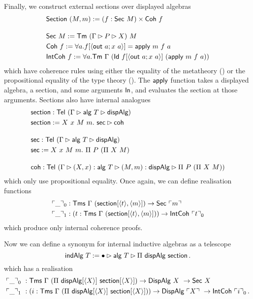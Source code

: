 Finally, we construct external sections over displayed algebras
\begin{align*}
     &\mta{Section}\ (M, m) := (f : \mta{Sec}\ M) \times \mta{Coh}\ f \\[1em]
     &\mta{Sec}\ M := \Tm\ (\Gamma \rhd P \rhd X)\ M \\
     &\mta{Coh}\ f := \forall a. f[\Msub{\mta{out}\ a; x\ a}] = \mta{apply}\ m\ f\ a \\
     &\mta{IntCoh}\ f := \forall a. \Tm\ \Gamma\ (\mta{Id}\ f[\Msub{\mta{out}\ a; x\ a}]\ (\mta{apply}\ m\ f\ a))
\end{align*}
which have coherence rules using either the equality of the metatheory () or
the propositional equality of the type theory ().
The $\textsf{apply}$ function takes a displayed algebra, a section, and some
arguments $\textsf{In}$, and evaluates the section at those arguments.
Sections also have internal analogues
\begin{align*}
&\textsf{section} : \textsf{Tel}\ (\Gamma \rhd \textsf{alg}\ T \rhd \textsf{dispAlg}) \\
    &\textsf{section} := X\ x\ M\ m.\ \textsf{sec} \rhd \textsf{coh} \\[1em]
    &\textsf{sec} : \textsf{Tel}\ (\Gamma \rhd \textsf{alg}\ T \rhd \textsf{dispAlg}) \\
    &\textsf{sec} := X\ x\ M\ m.\ \Pi\ P\ (\Pi\ X\ M) \\[1em]
    &\textsf{coh} : \textsf{Tel}\ (\Gamma \rhd (X, x) : \textsf{alg}\ T\rhd (M, m) : \textsf{dispAlg} \rhd \Pi\ P\ (\Pi\ X\ M))
\end{align*}
which only use propositional equality.
Once again, we can define realisation functions
\begin{align*}
    &\emb{\_}_0 : \Tms\ \Gamma\ (\mta{section}[\Msub{t},\Msub{m}]) \to \mta{Sec}\ \emb{m} \\
    &\emb{\_}_1 : (t : \Tms\ \Gamma\ (\mta{section}[\Msub{t},\Msub{m}])) \to \mta{IntCoh}\ \emb{t}_0
\end{align*}
which produce only internal coherence proofs.

Now we can define a synonym for internal inductive algebras as a telescope
\[
    \textsf{indAlg}\ T := \bullet \rhd \textsf{alg}\ T \rhd \Pi\ \textsf{dispAlg}\ \textsf{section} \,.
\]
which has a realisation
\begin{align*}
    &\emb{\_}_0\ : \mta{Tms}\ \Gamma\ (\Pi\ \mta{dispAlg}[\Msub X]\ \mta{section}[\Msub X]) \to \mta{DispAlg}\ X\ \to \mta{Sec}\ X \\
    &\emb{\_}_1\ : (i : \mta{Tms}\ \Gamma\ (\Pi\ \mta{dispAlg}[\Msub X]\ \mta{section}[\Msub X])) \to \mta{DispAlg}\ \emb{X}\ \to \mta{IntCoh}\ \emb{i}_0 \,.
\end{align*}


